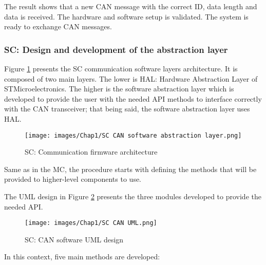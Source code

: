 The result shows that a new CAN message with the correct ID, data length and data is received. The hardware and software setup is validated. The system is ready to exchange CAN messages.

\subsubsection{SC: Design and development of the abstraction layer}

Figure \ref{SC Communication firmware layers architecture} presents the SC communication software layers architecture. It is composed of two main layers. The lower is \colorbox{green!50}{HAL}: Hardware Abstraction Layer of STMicroelectronics. The higher is the \colorbox{blue!20}{software abstraction layer} which is developed to provide the user with the needed API methods to interface correctly with the CAN transceiver; that being said, the software abstraction layer uses HAL.

\begin{figure}[H]
\begin{center}
\texttt{[image: images/Chap1/SC CAN software abstraction layer.png]}\\
\caption{SC: Communication firmware architecture}
\label{SC Communication firmware layers architecture}
\end{center}
\end{figure}

Same as in the MC, the procedure starts with defining the methods that will be provided to higher-level components to use.

The UML design in Figure \ref{SC CAN UML} presents the three modules developed to provide the needed API.

\begin{figure}[H]
\begin{center}
\texttt{[image: images/Chap1/SC CAN UML.png]}\\
\caption{SC: CAN software UML design}
\label{SC CAN UML}
\end{center}
\end{figure}

In this context, five main methods are developed:

